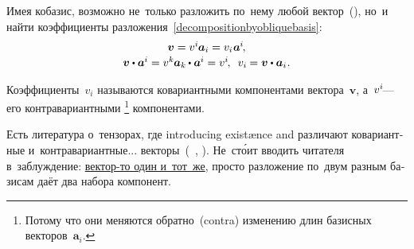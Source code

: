\begin{otherlanguage}{russian}
\begin{tcolorbox}
\par\end{tcolorbox}

Имея кобазис,
возможно
не~только разложить по~нему
любой вектор~(),
но~и найти
коэффициенты разложения~\eqref{decompositionbyobliquebasis}:
\begin{equation}\begin{array}{c}
\bm{v} = v^{i} \hspace{-0.1ex} \bm{a}_i = v_{i} \hspace{.1ex} \bm{a}^{\hspace{-0.05ex}i} \hspace{-0.25ex},
\\[.16em]
\bm{v} \dotp \bm{a}^{\hspace{-0.05ex}i} = v^{k} \hspace{-0.1ex} \bm{a}_k \hspace{-0.1ex} \dotp \bm{a}^{\hspace{-0.05ex}i} = v^{i} \hspace{-0.25ex}, \:\;
v_{i} \hspace{-0.1ex} = \bm{v} \dotp \bm{a}_i \hspace{.1ex} .
\end{array}\end{equation}

\noindent
Коэффициенты~${v_i}$
называются
ко\-вариант\-ными
компонентами
вектора~$\bm{v}$,
а~${v^i \hspace{-0.25ex}}$\:---
его контра\-вариант\-ными%
\footnote{Потому что они меняются обратно~(contra) изменению длин базисных векторов~${\bm{a}_i}$.}\hspace{-0.2ex}
компонентами.

Есть литература о~тензорах,
где introducing existænce
and различают ко\-вариант\-ные
и~контра\-вариант\-ные...
векторы~(~, ).
Не~ст\'{о}ит вводить читателя в~заблуждение\::
\href{https://www.physicsforums.com/threads/is-a-vector-itself-contra-covariant-or-just-its-components.994318/}{вектор\hbox{-}то один и~тот~же},
просто разложение по~двум разным базисам
даёт два набора компонент.

\end{otherlanguage}



